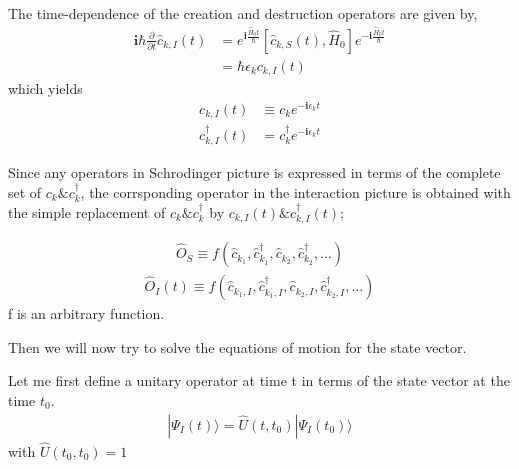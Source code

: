 ﻿\documentclass[twoside]{book}
\numberwithin{equation}{section}
\begin{document}
 The time-dependence of the creation and destruction operators are given by,
\begin{align}
\bm{i} \hbar \frac{\partial}{\partial t} \hat c_{k,I}(t) &= e^{\bm{i}  \frac{\hat H_0t}{\hbar}}[\hat c_{k,S}(t), \hat H_0] e^{-\bm{i}  \frac{\hat H_0t}{\hbar}} \nonumber \\
&=\hbar \epsilon_k c_{k,I}(t) \nonumber
\end{align}
which yields
\begin{align}
c_{k,I}(t)&\equiv c_k e^{-\bm{i}\epsilon_kt} \nonumber \\
c_{k,I}^{\dagger}(t)&= c^{\dagger}_k e^{-\bm{i}\epsilon_kt} \nonumber
\end{align}

 Since any operators in Schrodinger picture is expressed in terms of the complete set of $c_k \& c^{\dagger}_k$, the corrsponding operator in the interaction picture is obtained with the simple replacement of $c_k \& c^{\dagger}_k$ by $c_{k,I}(t) \& c^{\dagger}_{k,I}(t)$;

\begin{align}
\hat O_S \equiv f(\hat c_{k_1},\hat c^{\dagger}_{k_1},\hat c_{k_2},\hat c^{\dagger}_{k_2},...)\nonumber
\end{align}
\begin{align}
\hat O_I(t) \equiv f(\hat c_{k_1,I},\hat c^{\dagger}_{k_1,I},\hat c_{k_2,I},\hat c^{\dagger}_{k_2,I},...)\nonumber
\end{align}
f is an arbitrary function.

 Then we will now try to solve the equations of motion for the state vector.

 Let me first define a unitary operator at time t in terms of the state vector at the time $t_0$.
\begin{align}
|\Psi_I(t)\rangle=\hat U(t,t_0)|\Psi_I(t_0)\rangle
\end{align}
with $\hat U(t_0,t_0)=1$
\end{document}
